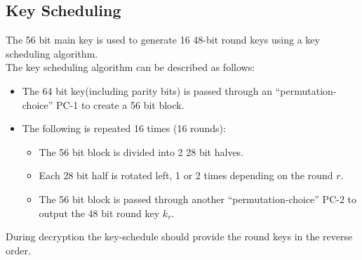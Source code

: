 \documentclass{article}
\begin{document}
\subsection{Key Scheduling}
The 56 bit main key is used to generate 16 48-bit round keys using a key scheduling algorithm.\\
The key scheduling algorithm can be described as follows:
\begin{itemize}
\item The 64 bit key(including parity bits) is passed through an ``permutation-choice'' PC-1 to create a 56 bit block.
\item The following is repeated 16 times (16 rounds):
  \begin{itemize}
    \item The 56 bit block is divided into 2 28 bit halves.
    \item Each 28 bit half is rotated left, 1 or 2 times depending on the round $r$.
    \item The 56 bit block is passed through another ``permutation-choice'' PC-2 to output the 48 bit round key $k_r$.
  \end{itemize}
\end{itemize}
During decryption the key-schedule should provide the round keys in the reverse order.

\pagebreak
\end{document}
